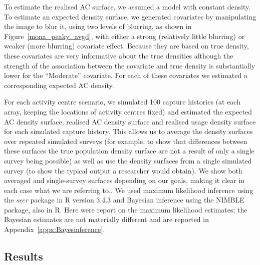 \documentclass[10pt,a4paper]{article}
\begin{document}
To estimate the realised AC surface, we assumed a model with constant density. To estimate an expected density surface, we generated covariates by manipulating the image to  blur it, using two levels of blurring, as shown in Figure~\ref{mona_peaky_avgd}, with either a strong (relatively little blurring) or weaker (more blurring) covariate effect. Because they are based on true density, these covariates are very informative about the true densities although the strength of the association between the covariate and true density is substantially lower for the ``Moderate'' covariate. For each of these covariates we estimated a corresponding expected AC density.

For each activity centre scenario, we simulated 100 capture histories (at each array, keeping the locations of activity centres fixed) and estimated the expected AC density surface, realised AC density surface and realised usage density surface for each simulated capture history. This allows us to average the density surfaces over repeated simulated surveys (for example, to show that differences between these surfaces the true population density surface are not a result of only a single survey being possible) as well as use the density surfaces from a single simulated survey (to show the typical output a researcher would obtain). We show both averaged and single-survey surfaces depending on our goals, making it clear in each case what we are referring to.. We used maximum likelihood inference using the {\it secr} package in R version 3.4.3 and Bayesian inference using the NIMBLE package, also in R. Here were report on the maximum likelihood estimates; the Bayesian estimates are not materially different and are reported in Appendix~\ref{appx:Bayesinference}.


\subsection{Results}
\end{document}
